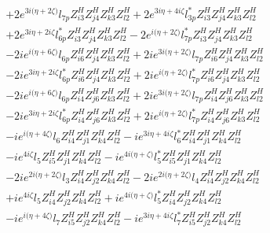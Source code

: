 \begin{align}
 &+2 e^{3 i \Big(\eta +2 \zeta \Big)} l_{7p} Z_{{i 3}}^{H} Z_{{j 4}}^{H} Z_{{k 3}}^{H} Z_{{l 2}}^{H} +2 e^{3 i \eta +4 i \zeta } l_{3p}^* Z_{{i 3}}^{H} Z_{{j 4}}^{H} Z_{{k 3}}^{H} Z_{{l 2}}^{H} \nonumber \\ 
 &+2 e^{3 i \eta +2 i \zeta } l_{6p}^* Z_{{i 3}}^{H} Z_{{j 4}}^{H} Z_{{k 3}}^{H} Z_{{l 2}}^{H} -2 e^{i \Big(\eta +2 \zeta \Big)} l_{7p}^* Z_{{i 3}}^{H} Z_{{j 4}}^{H} Z_{{k 3}}^{H} Z_{{l 2}}^{H} \nonumber \\ 
 &-2 i e^{i \Big(\eta +6 \zeta \Big)} l_{6p} Z_{{i 6}}^{H} Z_{{j 4}}^{H} Z_{{k 3}}^{H} Z_{{l 2}}^{H} +2 i e^{3 i \Big(\eta +2 \zeta \Big)} l_{7p} Z_{{i 6}}^{H} Z_{{j 4}}^{H} Z_{{k 3}}^{H} Z_{{l 2}}^{H} \nonumber \\ 
 &-2 i e^{3 i \eta +2 i \zeta } l_{6p}^* Z_{{i 6}}^{H} Z_{{j 4}}^{H} Z_{{k 3}}^{H} Z_{{l 2}}^{H} +2 i e^{i \Big(\eta +2 \zeta \Big)} l_{7p}^* Z_{{i 6}}^{H} Z_{{j 4}}^{H} Z_{{k 3}}^{H} Z_{{l 2}}^{H} \nonumber \\ 
 &-2 i e^{i \Big(\eta +6 \zeta \Big)} l_{6p} Z_{{i 4}}^{H} Z_{{j 6}}^{H} Z_{{k 3}}^{H} Z_{{l 2}}^{H} +2 i e^{3 i \Big(\eta +2 \zeta \Big)} l_{7p} Z_{{i 4}}^{H} Z_{{j 6}}^{H} Z_{{k 3}}^{H} Z_{{l 2}}^{H} \nonumber \\ 
 &-2 i e^{3 i \eta +2 i \zeta } l_{6p}^* Z_{{i 4}}^{H} Z_{{j 6}}^{H} Z_{{k 3}}^{H} Z_{{l 2}}^{H} +2 i e^{i \Big(\eta +2 \zeta \Big)} l_{7p}^* Z_{{i 4}}^{H} Z_{{j 6}}^{H} Z_{{k 3}}^{H} Z_{{l 2}}^{H} \nonumber \\ 
 &-i e^{i \Big(\eta +4 \zeta \Big)} l_6 Z_{{i 4}}^{H} Z_{{j 1}}^{H} Z_{{k 4}}^{H} Z_{{l 2}}^{H} -i e^{3 i \eta +4 i \zeta } l_6^* Z_{{i 4}}^{H} Z_{{j 1}}^{H} Z_{{k 4}}^{H} Z_{{l 2}}^{H} \nonumber \\ 
 &-i e^{4 i \zeta } l_5 Z_{{i 5}}^{H} Z_{{j 1}}^{H} Z_{{k 4}}^{H} Z_{{l 2}}^{H} -i e^{4 i \Big(\eta +\zeta \Big)} l_5^* Z_{{i 5}}^{H} Z_{{j 1}}^{H} Z_{{k 4}}^{H} Z_{{l 2}}^{H} \nonumber \\ 
 &-2 i e^{2 i \Big(\eta +2 \zeta \Big)} l_3 Z_{{i 4}}^{H} Z_{{j 2}}^{H} Z_{{k 4}}^{H} Z_{{l 2}}^{H} -2 i e^{2 i \Big(\eta +2 \zeta \Big)} l_4 Z_{{i 4}}^{H} Z_{{j 2}}^{H} Z_{{k 4}}^{H} Z_{{l 2}}^{H} \nonumber \\ 
 &+i e^{4 i \zeta } l_5 Z_{{i 4}}^{H} Z_{{j 2}}^{H} Z_{{k 4}}^{H} Z_{{l 2}}^{H} +i e^{4 i \Big(\eta +\zeta \Big)} l_5^* Z_{{i 4}}^{H} Z_{{j 2}}^{H} Z_{{k 4}}^{H} Z_{{l 2}}^{H} \nonumber \\ 
 &-i e^{i \Big(\eta +4 \zeta \Big)} l_7 Z_{{i 5}}^{H} Z_{{j 2}}^{H} Z_{{k 4}}^{H} Z_{{l 2}}^{H} -i e^{3 i \eta +4 i \zeta } l_7^* Z_{{i 5}}^{H} Z_{{j 2}}^{H} Z_{{k 4}}^{H} Z_{{l 2}}^{H} \nonumber \\ 

\end{align}
